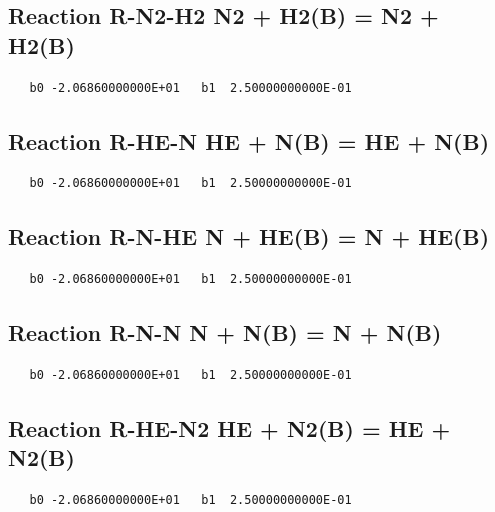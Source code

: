 \documentclass[12pt]{article}
\begin{document}
\subsection{
Reaction R-N2-H2 N2 + H2(B) = N2 + H2(B) }
\begin{small}\begin{verbatim}
   b0 -2.06860000000E+01   b1  2.50000000000E-01
\end{verbatim}\end{small}
\newpage

\subsection{
Reaction R-HE-N HE + N(B) = HE + N(B) }
\begin{small}\begin{verbatim}
   b0 -2.06860000000E+01   b1  2.50000000000E-01
\end{verbatim}\end{small}
\newpage

\subsection{
Reaction R-N-HE N + HE(B) = N + HE(B) }
\begin{small}\begin{verbatim}
   b0 -2.06860000000E+01   b1  2.50000000000E-01
\end{verbatim}\end{small}
\newpage

\subsection{
Reaction R-N-N N + N(B) = N + N(B) }
\begin{small}\begin{verbatim}
   b0 -2.06860000000E+01   b1  2.50000000000E-01
\end{verbatim}\end{small}
\newpage

\subsection{
Reaction R-HE-N2 HE + N2(B) = HE + N2(B) }
\begin{small}\begin{verbatim}
   b0 -2.06860000000E+01   b1  2.50000000000E-01
\end{verbatim}\end{small}
\newpage
\end{document}
